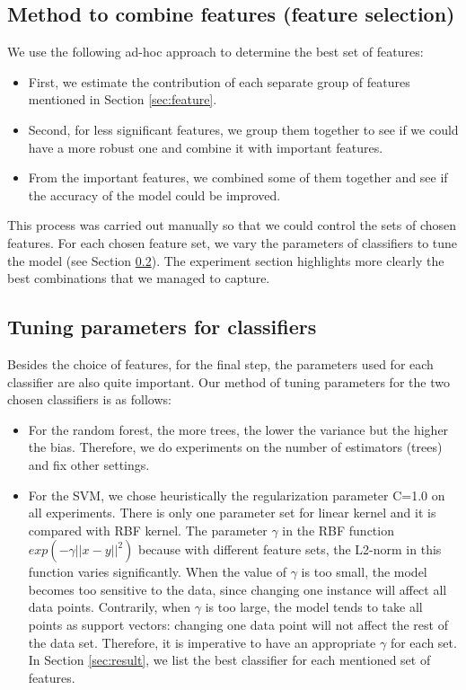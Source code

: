 \documentclass{article}
\begin{document}
\subsection{Method to combine features (feature selection)}

We use the following ad-hoc approach to determine the best set of features:
\begin{itemize}
\item First, we estimate the contribution of each separate group of features mentioned in Section \ref{sec:feature}.
\item Second, for less significant features, we group them together to see if we could have a more robust one and combine it with important features.
\item From the important features, we combined some of them together and see if the accuracy of the model could be improved.
\end{itemize}
This process was carried out manually so that we could control the sets of chosen features. For each chosen feature set, we vary the parameters of classifiers to tune the model (see Section \ref{sec:tuning}). The experiment section highlights more clearly the best combinations that we managed to capture.

\subsection{Tuning parameters for classifiers}
\label{sec:tuning}
Besides the choice of features, for the final step, the parameters used for each classifier are also quite important. Our method of tuning parameters for the two chosen classifiers is as follows:
\begin{itemize}
\item For the random forest, the more trees, the lower the variance but the higher the bias. Therefore, we do experiments on the number of estimators (trees) and fix other settings.
\item For the SVM, we chose heuristically the regularization parameter C=1.0 on all experiments. There is only one parameter set for linear kernel and it is compared with RBF kernel. The parameter $\gamma$ in the RBF function $exp(-\gamma||x-y||^2)$ because with different feature sets, the L2-norm in this function varies significantly. When the value of $\gamma$ is too small, the model becomes too sensitive to the data, since changing one instance will affect all data points. Contrarily, when $\gamma$ is too large, the model tends to take all points as support vectors: changing one data point will not affect the rest of the data set. Therefore, it is imperative to have an appropriate $\gamma$ for each set. In Section \ref{sec:result}, we list the best classifier for each mentioned set of features.
\end{itemize}
\end{document}
